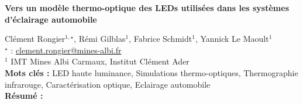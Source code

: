 


    \newpage


%
\begin{flushleft}
\addtocounter{section}{1}
{\Large \textbf{Vers un modèle thermo-optique des LEDs utilisées dans les systèmes d'éclairage automobile}}\label{ref:24}
\end{flushleft}
%
Clément Rongier$^{1,\star}$, Rémi Gilblas$^{1}$, Fabrice Schmidt$^{1}$, Yannick Le Maoult$^{1}$\\[2mm]
$^{\star}$ \Letter : \url{clement.rongier@mines-albi.fr}\\[2mm]
{\footnotesize $^{1}$ IMT Mines Albi Carmaux, Institut Clément Ader}\\
[4mm]
%
\noindent \textbf{Mots clés : } LED haute luminance, Simulations thermo-optiques, Thermographie infrarouge, Caractérisation optique, Eclairage automobile\\[4mm]
%
\noindent \textbf{Résumé : } 

